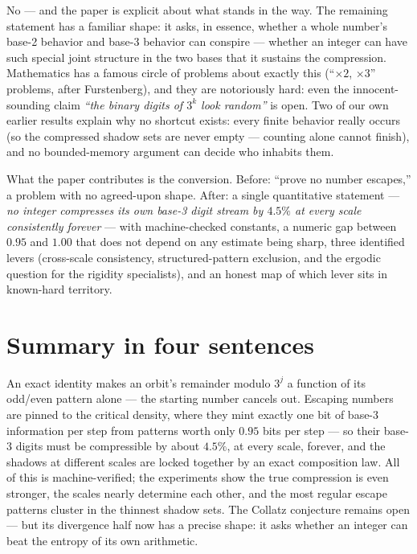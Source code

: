 \documentclass[11pt]{article}
\begin{document}
No --- and the paper is explicit about what stands in the way. The
remaining statement has a familiar shape: it asks, in essence, whether
a whole number's base-2 behavior and base-3 behavior can conspire ---
whether an integer can have such special joint structure in the two
bases that it sustains the compression. Mathematics has a famous
circle of problems about exactly this (``$\times 2$, $\times 3$''
problems, after Furstenberg), and they are notoriously hard: even the
innocent-sounding claim \emph{``the binary digits of $3^k$ look
random''} is open. Two of our own earlier results explain why no
shortcut exists: every finite behavior really occurs (so the
compressed shadow sets are never empty --- counting alone cannot
finish), and no bounded-memory argument can decide who inhabits them.

What the paper contributes is the conversion. Before: ``prove no
number escapes,'' a problem with no agreed-upon shape. After: a
single quantitative statement --- \emph{no integer compresses its own
base-3 digit stream by $4.5\%$ at every scale consistently forever}
--- with machine-checked constants, a numeric gap between $0.95$ and
$1.00$ that does not depend on any estimate being sharp, three
identified levers (cross-scale consistency, structured-pattern
exclusion, and the ergodic question for the rigidity specialists), and
an honest map of which lever sits in known-hard territory.

\section{Summary in four sentences}

An exact identity makes an orbit's remainder modulo $3^j$ a function
of its odd/even pattern alone --- the starting number cancels out.
Escaping numbers are pinned to the critical density, where they mint
exactly one bit of base-3 information per step from patterns worth
only $0.95$ bits per step --- so their base-3 digits must be
compressible by about $4.5\%$, at every scale, forever, and the
shadows at different scales are locked together by an exact
composition law. All of this is machine-verified; the experiments show
the true compression is even stronger, the scales nearly determine
each other, and the most regular escape patterns cluster in the
thinnest shadow sets. The Collatz conjecture remains open --- but its
divergence half now has a precise shape: it asks whether an integer
can beat the entropy of its own arithmetic.
\end{document}
